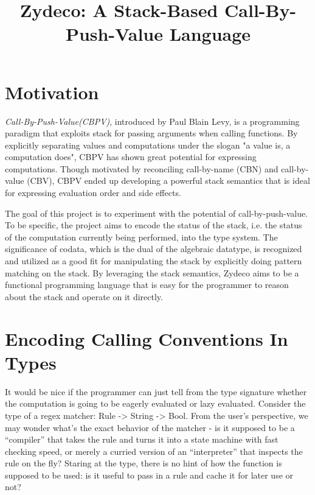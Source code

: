 \documentclass[acmsmall,nonacm]{acmart}
\title{Zydeco: A Stack-Based Call-By-Push-Value Language}
\begin{document}
\renewcommand{\thesection}{\Alph{section}}

\maketitle

\section{Motivation}

\textit{Call-By-Push-Value(CBPV)}, introduced by Paul Blain Levy, is a programming paradigm that exploits stack for passing arguments when calling functions. By explicitly separating values and computations under the slogan "a value is, a computation does", CBPV has shown great potential for expressing computations. Though motivated by reconciling call-by-name (CBN) and call-by-value (CBV), CBPV ended up developing a powerful stack semantics that is ideal for expressing evaluation order and side effects.

The goal of this project is to experiment with the potential of call-by-push-value. To be specific, the project aims to encode the status of the stack, i.e. the status of the computation currently being performed, into the type system. The significance of codata, which is the dual of the algebraic datatype, is recognized and utilized as a good fit for manipulating the stack by explicitly doing pattern matching on the stack. By leveraging the stack semantics, Zydeco aims to be a functional programming language that is easy for the programmer to reason about the stack and operate on it directly.

\section{Encoding Calling Conventions In Types}

It would be nice if the programmer can just tell from the type signature whether the computation is going to be eagerly evaluated or lazy evaluated. Consider the type of a regex matcher: Rule -> String -> Bool. From the user's perspective, we may wonder what's the exact behavior of the matcher - is it supposed to be a ``compiler'' that takes the rule and turns it into a state machine with fast checking speed, or merely a curried version of an ``interpreter'' that inspects the rule on the fly? Staring at the type, there is no hint of how the function is supposed to be used: is it useful to pass in a rule and cache it for later use or not?
\end{document}
